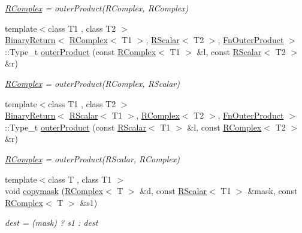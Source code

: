 \begin{DoxyCompactItemize}
\begin{DoxyCompactList}\small\item\em \mbox{\hyperlink{classENSEM_1_1RComplex}{R\+Complex}} = outer\+Product(\+R\+Complex, R\+Complex) \end{DoxyCompactList}\item 
{\footnotesize template$<$class T1 , class T2 $>$ }\\\mbox{\hyperlink{structENSEM_1_1BinaryReturn}{Binary\+Return}}$<$ \mbox{\hyperlink{classENSEM_1_1RComplex}{R\+Complex}}$<$ T1 $>$, \mbox{\hyperlink{classENSEM_1_1RScalar}{R\+Scalar}}$<$ T2 $>$, \mbox{\hyperlink{structENSEM_1_1FnOuterProduct}{Fn\+Outer\+Product}} $>$\+::Type\+\_\+t \mbox{\hyperlink{group__rcomplex_ga3452d86b3ff7fc9db6565959c2f896db}{outer\+Product}} (const \mbox{\hyperlink{classENSEM_1_1RComplex}{R\+Complex}}$<$ T1 $>$ \&l, const \mbox{\hyperlink{classENSEM_1_1RScalar}{R\+Scalar}}$<$ T2 $>$ \&r)
\begin{DoxyCompactList}\small\item\em \mbox{\hyperlink{classENSEM_1_1RComplex}{R\+Complex}} = outer\+Product(\+R\+Complex, R\+Scalar) \end{DoxyCompactList}\item 
{\footnotesize template$<$class T1 , class T2 $>$ }\\\mbox{\hyperlink{structENSEM_1_1BinaryReturn}{Binary\+Return}}$<$ \mbox{\hyperlink{classENSEM_1_1RScalar}{R\+Scalar}}$<$ T1 $>$, \mbox{\hyperlink{classENSEM_1_1RComplex}{R\+Complex}}$<$ T2 $>$, \mbox{\hyperlink{structENSEM_1_1FnOuterProduct}{Fn\+Outer\+Product}} $>$\+::Type\+\_\+t \mbox{\hyperlink{group__rcomplex_ga5f17e33943ff2fbe7237c0aa4182d06c}{outer\+Product}} (const \mbox{\hyperlink{classENSEM_1_1RScalar}{R\+Scalar}}$<$ T1 $>$ \&l, const \mbox{\hyperlink{classENSEM_1_1RComplex}{R\+Complex}}$<$ T2 $>$ \&r)
\begin{DoxyCompactList}\small\item\em \mbox{\hyperlink{classENSEM_1_1RComplex}{R\+Complex}} = outer\+Product(\+R\+Scalar, R\+Complex) \end{DoxyCompactList}\item 
{\footnotesize template$<$class T , class T1 $>$ }\\void \mbox{\hyperlink{group__rcomplex_ga8228a6185ea266e1e7d4c221c76bd5f1}{copymask}} (\mbox{\hyperlink{classENSEM_1_1RComplex}{R\+Complex}}$<$ T $>$ \&d, const \mbox{\hyperlink{classENSEM_1_1RScalar}{R\+Scalar}}$<$ T1 $>$ \&mask, const \mbox{\hyperlink{classENSEM_1_1RComplex}{R\+Complex}}$<$ T $>$ \&s1)
\begin{DoxyCompactList}\small\item\em dest = (mask) ? s1 \+: dest \end{DoxyCompactList}\item 

\end{DoxyCompactItemize}
